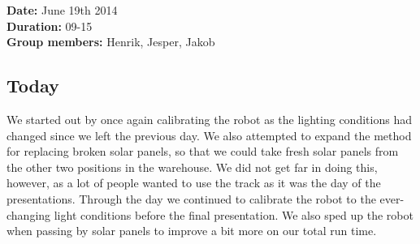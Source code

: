 \textbf{Date:} June 19th 2014\\\textbf{Duration:} 09-15\\\textbf{Group
members:} Henrik, Jesper, Jakob

\subsection{Today}

We started out by once again calibrating the robot as the lighting
conditions had changed since we left the previous day. We also attempted
to expand the method for replacing broken solar panels, so that we could
take fresh solar panels from the other two positions in the warehouse.
We did not get far in doing this, however, as a lot of people wanted to
use the track as it was the day of the presentations. Through the day we
continued to calibrate the robot to the ever-changing light conditions
before the final presentation. We also sped up the robot when passing by
solar panels to improve a bit more on our total run time.
